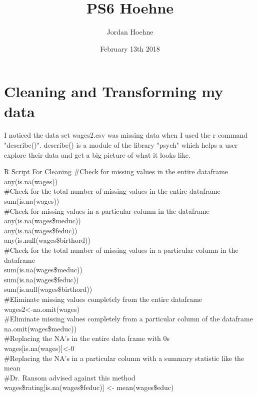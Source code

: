 \documentclass{article}
\title{PS6 Hoehne}
\author{Jordan Hoehne }
\date{February 13th 2018}
\begin{document}
\maketitle

\section{Cleaning and Transforming my data}
I noticed the data set wages2.csv was missing data when I used the r command "describe()". describe() is a module of the library "psych" which helps a user explore their data and get a big picture of what it looks like.

\begin{subsection}{R Script For Cleaning}
\#Check for missing values in the entire dataframe\\
any(is.na(wages))\\
\#Check for the total number of missing values in the entire dataframe\\
sum(is.na(wages))\\
\#Check for missing values in a particular column in the dataframe\\
any(is.na(wages\$meduc))\\
any(is.na(wages\$feduc))\\
any(is.null(wages\$birthord))\\
\#Check for the total number of missing values in a particular column in the dataframe \\
sum(is.na(wages\$meduc))\\
sum(is.na(wages\$feduc))\\
sum(is.null(wages\$birthord))\\
\#Eliminate missing values completely from the entire dataframe \\
wages2<-na.omit(wages)\\
\#Eliminate missing values completely from a particular column of the dataframe \\
na.omit(wages\$meduc)) \\
\#Replacing the NA's in the entire data frame with 0s\\
wages[is.na(wages)]<-0 \\
\#Replacing the NA's in a particular column with a summary statistic like the mean \\
\#Dr. Ransom advised against this method \\
wages\$rating[is.na(wages\$feduc)] <- mean(wages\$educ) \\
\end{subsection}
\end{document}

